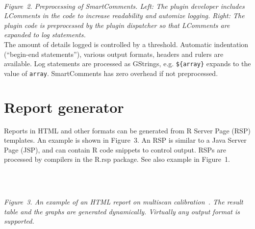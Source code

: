 \documentclass[portrait,plainsections]{sciposter}
\begin{document}
\begin{multicols}{3}
\begin{minipage}{\columnwidth}
\vspace{1ex}
\raisebox{2em}{$\Rightarrow$}
~\\[0.1ex]
\emph{Figure~2. Preprocessing of SmartComments.  \emph{Left}: The plugin developer includes LComments in the code to increase readability and automize logging.  \emph{Right}: The plugin code is preprocessed by the plugin dispatcher so that LComments are expanded to log statements.}
~\\[1ex]


The amount of details logged is controlled by a threshold.  Automatic indentation (``begin-end statements''), various output formats, headers and rulers are available.  Log statements are processed as GStrings, e.g. \texttt{\$\{array\}} expands to the value of \texttt{array}.
SmartComments has zero overhead if not preprocessed.
\end{minipage}


\section{Report generator}
Reports in HTML and other formats can be generated from R Server Page (RSP) templates.  An example is shown in Figure~3.  An RSP is similar to a Java Server Page (JSP), and can contain R code snippets to control output.  RSPs are processed by compilers in the R.rsp package.  See also example in Figure~1.\\
\begin{minipage}{\columnwidth}
~\\[0.6ex]
\begin{center}
\end{center}
~\\[0.1ex]
\emph{Figure~3. An example of an HTML report on multiscan calibration~\cite{BengtssonH_etal_2004,BengtssonHossjer_2003}. The result table and the graphs are generated dynamically.  Virtually any output format is supported.}
\end{minipage}




\end{multicols}
\end{document}
